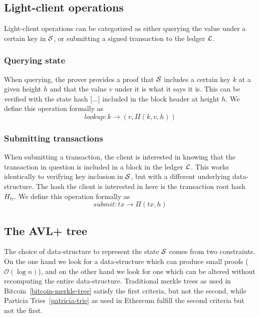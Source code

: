 \subsection{Light-client operations}

Light-client operations can be categorized as either querying the value under a
certain key in $\mathcal{S}$, or submitting a signed transaction to the ledger
$\mathcal{L}$.

\subsubsection{Querying state}

When querying, the prover provides a proof that $\mathcal{S}$ includes a certain key
$k$ at a given height $h$ and that the value $v$ under it is what it says it
is. This can be verified with the state hash [...] included in the block header
at height $h$. We define this operation formally as
\[
    lookup : k \to (v, \Pi(k, v, h))
\]

\subsubsection{Submitting transactions}

When submitting a transaction, the client is interested in knowing that the
transaction in question is included in a block in the ledger $\mathcal{L}$. This
works identically to verifying key inclusion in $\mathcal{S}$, but with a different
underlying data-structure. The hash the client is interested in here is the
transaction root hash $H_{tr}$. We define this operation formally as
\[
    submit : tx \to \Pi(tx, h)
\]

\subsection{The AVL+ tree}

The choice of data-structure to represent the state $\mathcal{S}$ comes from two
constraints.  On the one hand we look for a data-structure which can produce
small proofs ($\mathcal{O}(\log n)$), and on the other hand we look for one
which can be altered without recomputing the entire data-structure. Traditional
merkle trees as used in Bitcoin~\ref{bitcoin-merkle-tree} satisfy the first
criteria, but not the second, while Particia Tries~\ref{patricia-trie} as used
in Ethereum fulfill the second criteria but not the first.
